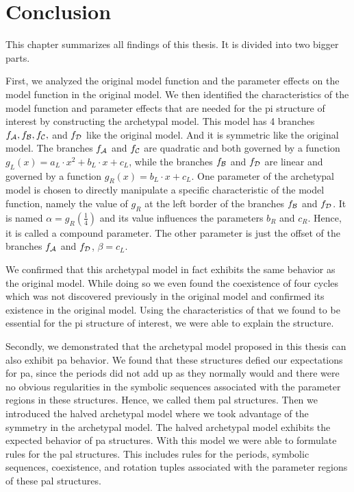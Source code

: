 \chapter{Conclusion}

This chapter summarizes all findings of this thesis.
It is divided into two bigger parts.

First, we analyzed the original model function and the parameter effects on the model function in the original model.
We then identified the characteristics of the model function and parameter effects that are needed for the \gls{pi} structure of interest by constructing the archetypal model.
This model has 4 branches $f_{\mathcal{A}}, f_{\mathcal{B}}, f_{\mathcal{C}},$ and $f_{\mathcal{D}}$ like the original model.
And it is symmetric like the original model.
The branches $f_{\mathcal{A}}$ and $f_{\mathcal{C}}$ are quadratic and both governed by a function $g_L(x) = a_L \cdot x^2 + b_L \cdot x + c_L$, while the branches $f_{\mathcal{B}}$ and $f_{\mathcal{D}}$ are linear and governed by a function $g_R(x) = b_L \cdot x + c_L$.
One parameter of the archetypal model is chosen to directly manipulate a specific characteristic of the model function, namely the value of $g_R$ at the left border of the branches $f_{\mathcal{B}}$ and $f_{\mathcal{D}}$.
It is named $\alpha = g_R\left(\frac{1}{4}\right)$ and its value influences the parameters $b_R$ and $c_R$.
Hence, it is called a compound parameter.
The other parameter is just the offset of the branches $f_{\mathcal{A}}$ and $f_{\mathcal{D}}$, $\beta = c_L$.


We confirmed that this archetypal model in fact exhibits the same behavior as the original model.
While doing so we even found the coexistence of four cycles which was not discovered previously in the original model and confirmed its existence in the original model.
Using the characteristics of that we found to be essential for the \gls{pi} structure of interest, we were able to explain the structure.

Secondly, we demonstrated that the archetypal model proposed in this thesis can also exhibit \gls{pa} behavior.
We found that these structures defied our expectations for \gls{pa}, since the periods did not add up as they normally would and there were no obvious regularities in the symbolic sequences associated with the parameter regions in these structures.
Hence, we called them \gls{pal} structures.
Then we introduced the halved archetypal model where we took advantage of the symmetry in the archetypal model.
The halved archetypal model exhibits the expected behavior of \gls{pa} structures.
With this model we were able to formulate rules for the \gls{pal} structures.
This includes rules for the periods, symbolic sequences, coexistence, and rotation tuples associated with the parameter regions of these \gls{pal} structures.


